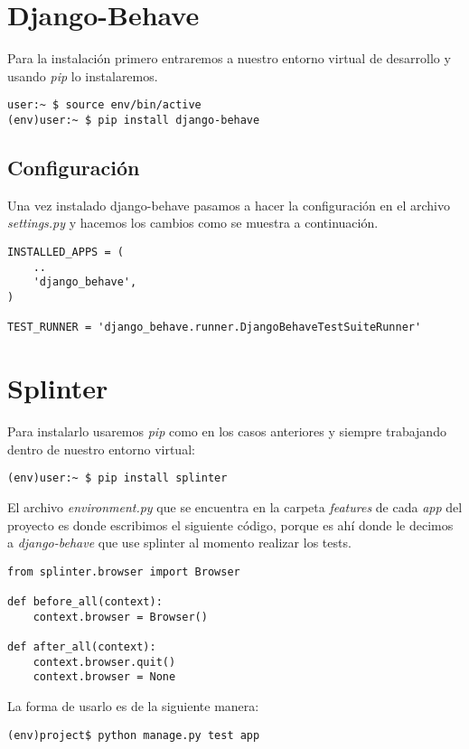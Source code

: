 \section{Django-Behave}
Para la instalación primero entraremos a nuestro entorno virtual de desarrollo y
usando {\it pip} lo instalaremos.

\begin{verbatim}
user:~ $ source env/bin/active
(env)user:~ $ pip install django-behave
\end{verbatim}

\subsection{Configuración}
Una vez instalado django-behave pasamos a hacer la configuración en el archivo
{\it settings.py} y hacemos los cambios como se muestra a continuación.
\begin{verbatim}
INSTALLED_APPS = (
    ..
    'django_behave',
)

TEST_RUNNER = 'django_behave.runner.DjangoBehaveTestSuiteRunner'
\end{verbatim}



\section{Splinter}
Para instalarlo usaremos {\it pip} como en los casos anteriores y siempre
trabajando dentro de nuestro entorno virtual:

\begin{verbatim}
(env)user:~ $ pip install splinter
\end{verbatim}

El archivo {\it environment.py} que se encuentra en la carpeta {\it features}
de cada {\it app} del proyecto es donde escribimos el siguiente código,
porque es ahí donde le decimos a {\it django-behave} que use splinter al momento
realizar los tests.

\begin{verbatim}
from splinter.browser import Browser

def before_all(context):
    context.browser = Browser()

def after_all(context):
    context.browser.quit()
    context.browser = None
\end{verbatim}

La forma de usarlo es de la siguiente manera:

\begin{verbatim}
(env)project$ python manage.py test app
\end{verbatim}

